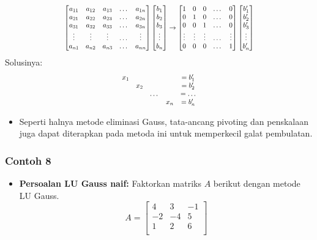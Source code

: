 \documentclass[pdflatex,compress,mathserif]{beamer}
\newcommand*{\Scale}[2][4]{\scalebox{#1}{$#2$}}%
\begin{document}
\begin{frame}
	\[\Scale[0.8]{
	\left[
		\begin{matrix}
			a_{11} & a_{12} & a_{13} & \dots & a_{1n}\\
			a_{21} & a_{22} & a_{23} & \dots & a_{2n}\\
			a_{31} & a_{32} & a_{33} & \dots & a_{3n}\\
			\vdots & \vdots & \vdots & \dots & \vdots\\
			a_{n1} & a_{n2} & a_{n3} & \dots & a_{nn}
		\end{matrix}
	\right]
	\left[
		\begin{matrix}
			b_1 \\ b_2 \\ b_3 \\ \vdots \\ b_n
		\end{matrix}
	\right]
	\rightarrow
	\left[
		\begin{matrix}
			1 & 0 & 0 & \dots & 0\\
			0 & 1 & 0 & \dots & 0\\
			0 & 0 & 1 & \dots & 0\\
			\vdots & \vdots & \vdots & \dots & \vdots\\
			0 & 0 & 0 & \dots & 1
		\end{matrix}
	\right]
	\left[
		\begin{matrix}
			b_1' \\ b_2' \\ b_3' \\ \vdots \\ b_n'
		\end{matrix}
	\right]
	}\]
	Solusinya:
	\[\Scale[0.8]{
	\begin{matrix}
		x_1 & & & &= b_1' \\
		&x_2  & & &= b_2' \\
		& & \dots & &= \dots \\
		& & & x_n &= b_n'
	\end{matrix}
	}\]
	\begin{itemize}
		\item Seperti halnya metode eliminasi Gauss, tata-ancang pivoting dan penskalaan juga dapat diterapkan pada metoda ini untuk memperkecil galat pembulatan.
	\end{itemize}
\end{frame}

\begin{frame}
	\frametitle{Contoh 8}
	\begin{itemize}
		\item \textbf{Persoalan LU Gauss naif:} Faktorkan matriks $ A $ berikut dengan metode LU Gauss.
		\[ A = 
		\begin{bmatrix}
			4 & 3 & -1\\
			-2 & -4 & 5\\
			1 & 2 & 6\\
		\end{bmatrix}
		\]
	\end{itemize}
\end{frame}
\end{document}
